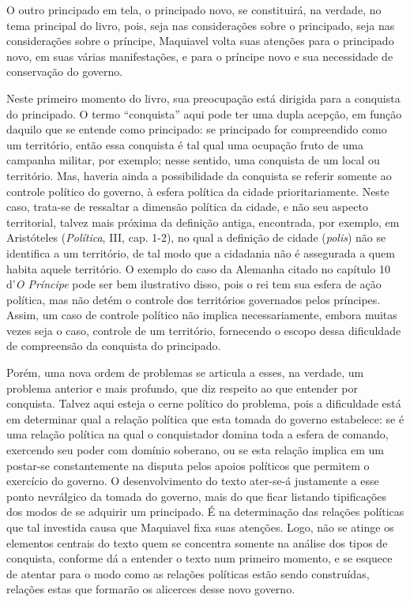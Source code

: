 O outro principado em tela, o principado novo, se constituirá, na
verdade, no tema principal do livro, pois, seja nas considerações sobre
o principado, seja nas considerações sobre o príncipe, Maquiavel volta
suas atenções para o principado novo, em suas várias manifestações, e
para o príncipe novo e sua necessidade de conservação do governo.

Neste primeiro momento do livro, sua preocupação está dirigida para a
conquista do principado. O termo ``conquista'' aqui pode ter uma dupla
acepção, em função daquilo que se entende como principado: se principado
for compreendido como um território, então essa conquista é tal qual uma
ocupação fruto de uma campanha militar, por exemplo; nesse sentido, uma
conquista de um local ou território. Mas, haveria ainda a possibilidade
da conquista se referir somente ao controle político do governo, à
esfera política da cidade prioritariamente. Neste caso, trata-se de
ressaltar a dimensão política da cidade, e não seu aspecto territorial,
talvez mais próxima da definição antiga, encontrada, por exemplo, em
Aristóteles (\emph{Política}, III, cap. 1-2), no qual a definição de
cidade (\emph{polis}) não se identifica a um território, de tal modo que
a cidadania não é assegurada a quem habita aquele território. O exemplo
do caso da Alemanha citado no capítulo 10 d'\emph{O Príncipe} pode ser
bem ilustrativo disso, pois o rei tem sua esfera de ação política, mas
não detém o controle dos territórios governados pelos príncipes. Assim,
um caso de controle político não implica necessariamente, embora muitas
vezes seja o caso, controle de um território, fornecendo o escopo dessa
dificuldade de compreensão da conquista do principado.

Porém, uma nova ordem de problemas se articula a esses, na verdade, um
problema anterior e mais profundo, que diz respeito ao que entender por
conquista. Talvez aqui esteja o cerne político do problema, pois a
dificuldade está em determinar qual a relação política que esta tomada
do governo estabelece: se é uma relação política na qual o conquistador
domina toda a esfera de comando, exercendo seu poder com domínio
soberano, ou se esta relação implica em um postar-se constantemente na
disputa pelos apoios políticos que permitem o exercício do governo. O
desenvolvimento do texto ater-se-á justamente a esse ponto nevrálgico da
tomada do governo, mais do que ficar listando tipificações dos modos de
se adquirir um principado. É na determinação das relações políticas que
tal investida causa que Maquiavel fixa suas atenções. Logo, não se
atinge os elementos centrais do texto quem se concentra somente na
análise dos tipos de conquista, conforme dá a entender o texto num
primeiro momento, e se esquece de atentar para o modo como as relações
políticas estão sendo construídas, relações estas que formarão os
alicerces desse novo governo.

